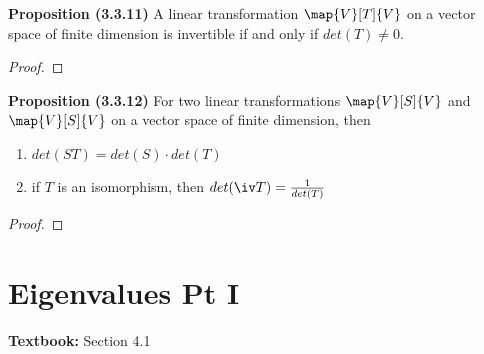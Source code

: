 \documentclass[letterpaper, 10pt]{article}
\begin{document}
\vspace{200pt}
\lb
\textbf{Proposition (3.3.11)}
\lb
A linear transformation $\map{V}[T]{V}$ on a vector space of finite dimension is invertible
if and only if $det(T) \neq 0$.
\begin{proof}
\end{proof}




\vspace{200pt}
\lb
\textbf{Proposition (3.3.12)}
\lb
For two linear transformations $\map{V}[S]{V}$ and $\map{V}[S]{V}$ on a vector space of
finite dimension, then
\begin{enumerate}
    \item $ det(ST) = det(S) \cdot det(T)$
    \item if $T$ is an isomorphism, then $det(\iv T) = \frac{1}{det(T)}$
\end{enumerate}
\begin{proof}
\end{proof}






\newpage
\section*{Eigenvalues Pt I}%
\textbf{Textbook:} Section 4.1
\end{document}
